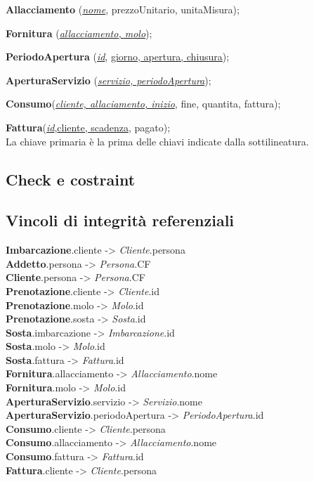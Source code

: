 \textbf{Allacciamento} (\underline{\textit{nome}}, prezzoUnitario, unitaMisura);

\textbf{Fornitura} (\underline{\textit{allacciamento, molo}});

\textbf{PeriodoApertura} (\underline{\textit{id}}, \underline{giorno, apertura, chiusura});

\textbf{AperturaServizio} (\underline{\textit{servizio, periodoApertura}});

\textbf{Consumo}(\underline{\textit{cliente, allaciamento, inizio}}, fine, quantita, fattura);

\textbf{Fattura}(\underline{\textit{id}},\underline{cliente, scadenza}, pagato);\\

La chiave primaria è la prima delle chiavi indicate dalla sottilineatura.

\subsection{Check e costraint}



\subsection{Vincoli di integrità referenziali}

\textbf{Imbarcazione}.cliente -> \textit{Cliente}.persona\\
\textbf{Addetto}.persona -> \textit{Persona}.CF\\
\textbf{Cliente}.persona -> \textit{Persona}.CF\\
\textbf{Prenotazione}.cliente -> \textit{Cliente}.id\\
\textbf{Prenotazione}.molo -> \textit{Molo}.id\\
\textbf{Prenotazione}.sosta -> \textit{Sosta}.id\\
\textbf{Sosta}.imbarcazione -> \textit{Imbarcazione}.id\\
\textbf{Sosta}.molo -> \textit{Molo}.id\\
\textbf{Sosta}.fattura -> \textit{Fattura}.id\\
\textbf{Fornitura}.allacciamento -> \textit{Allacciamento}.nome\\
\textbf{Fornitura}.molo -> \textit{Molo}.id\\
\textbf{AperturaServizio}.servizio -> \textit{Servizio}.nome\\
\textbf{AperturaServizio}.periodoApertura -> \textit{PeriodoApertura}.id\\
\textbf{Consumo}.cliente -> \textit{Cliente}.persona\\
\textbf{Consumo}.allacciamento -> \textit{Allacciamento}.nome\\
\textbf{Consumo}.fattura -> \textit{Fattura}.id\\
\textbf{Fattura}.cliente -> \textit{Cliente}.persona\\
